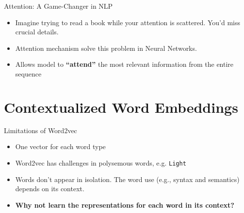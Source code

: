 \documentclass[serif, aspectratio=169]{beamer}
\begin{document}
\begin{frame}{Attention: A Game-Changer in NLP}
	\begin{itemize} 
		
		\item Imagine trying to read a book while your attention is scattered. You’d miss crucial details.
		\item Attention mechanism solve this problem in Neural Networks.
		\item Allows model to \textbf{“attend”} the most relevant information from the entire sequence
		
	\end{itemize}
\end{frame}

\section{Contextualized Word Embeddings}


\begin{frame}{Limitations of Word2vec}
    \begin{itemize} 
    
        \item One vector for each word type
        
        \item Word2vec has challenges in polysemous words, e.g. \texttt{Light}
        \item Words don’t appear in isolation. The word use (e.g., syntax and semantics) depends on its context.
        
        \item \textbf{Why not learn the representations for each word in its context?}

        \end{itemize}
\end{frame}
\end{document}
